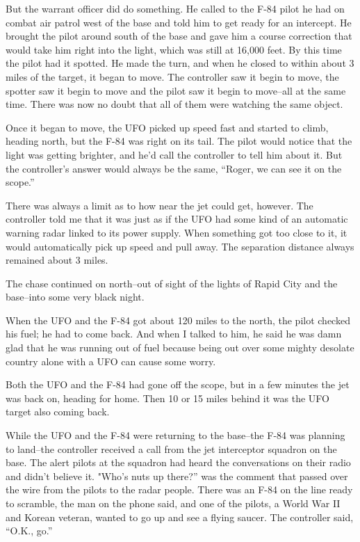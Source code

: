 \begin{svgraybox}
But the warrant officer did do something. He called to the F-84
pilot he had on combat air patrol west of the base and told him to
get ready for an intercept. He brought the pilot around south of the
base and gave him a course correction that would take him right into
the light, which was still at 16,000 feet. By this time the pilot had
it spotted. He made the turn, and when he closed to within about 3
miles of the target, it began to move. The controller saw it begin to
move, the spotter saw it begin to move and the pilot saw it begin to
move--all at the same time. There was now no doubt that all of them
were watching the same object.

Once it began to move, the UFO picked up speed fast and started to
climb, heading north, but the F-84 was right on its tail. The pilot
would notice that the light was getting brighter, and he'd call the
controller to tell him about it. But the controller's answer would
always be the same, ``Roger, we can see it on the scope.''

There was always a limit as to how near the jet could get, however.
The controller told me that it was just as if the UFO had some kind
of an automatic warning radar linked to its power supply. When
something got too close to it, it would automatically pick up speed
and pull away. The separation distance always remained about 3 miles.

The chase continued on north--out of sight of the lights of Rapid
City and the base--into some very black night.

When the UFO and the F-84 got about 120 miles to the north, the
pilot checked his fuel; he had to come back. And when I talked to
him, he said he was damn glad that he was running out of fuel because
being out over some mighty desolate country alone with a UFO can
cause some worry.

Both the UFO and the F-84 had gone off the scope, but in a few
minutes the jet was back on, heading for home. Then 10 or 15 miles
behind it was the UFO target also coming back.

While the UFO and the F-84 were returning to the base--the F-84 was
planning to land--the controller received a call from the jet
interceptor squadron on the base. The alert pilots at the squadron
had heard the conversations on their radio and didn't believe it.
"Who's nuts up there?'' was the comment that passed over the wire from
the pilots to the radar people. There was an F-84 on the line ready
to scramble, the man on the phone said, and one of the pilots, a
World War II and Korean veteran, wanted to go up and see a flying
saucer. The controller said, ``O.K., go.''


\end{svgraybox}
